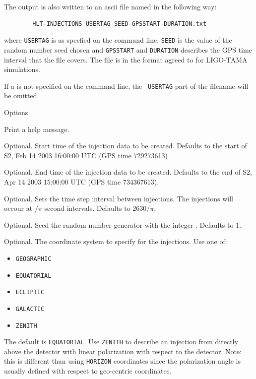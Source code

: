 \begin{entry}
The output is also written to an ascii file named in the following way:
\begin{center}
\begin{verbatim}
        HLT-INJECTIONS_USERTAG_SEED-GPSSTART-DURATION.txt
\end{verbatim}
\end{center}
where \verb$USERTAG$ is  as specfied on the command line,
\verb$SEED$ is the  value  of  the random number seed chosen and
\verb$GPSSTART$ and \verb$DURATION$ describes the GPS time interval that
the file covers. The file is in the format agreed to for LIGO-TAMA
simulations.  

If a  is not specified on the command line, the
\texttt{\_USERTAG} part of the filename will be omitted.

\item[Options]\leavevmode
\begin{entry}
\item[\option{--help}] Print a help message.

\item[\option{--gps-start-time} \parm{tstart}]
Optional.  Start time of the injection data to be created. Defaults to the
start of S2, Feb 14 2003 16:00:00 UTC (GPS time 729273613)

\item[\option{--gps-end-time} \parm{tend}]
Optional. End time of the injection data to be created. Defaults to the end
of S2, Apr 14 2003 15:00:00 UTC (GPS time 734367613).

\item[\option{--time-step} \parm{tstep}]
Optional. Sets the time step interval between injections. The injections
will occour at $/\pi$ second intervals. Defaults to $2630/\pi$.

\item[\option{--seed} \parm{seed}]
Optional. Seed the random number generator with the integer .
Defaults to $1$.

\item[\option{--coordinates} \parm{coordinates}] 
Optional.  The coordinate system to specify for the injections.  Use one
of:
\begin{itemize}
\item \texttt{GEOGRAPHIC}
\item \texttt{EQUATORIAL}
\item \texttt{ECLIPTIC}
\item \texttt{GALACTIC}
\item \texttt{ZENITH}
\end{itemize}
The default is \texttt{EQUATORIAL}.   Use \texttt{ZENITH} to describe an
injection from directly above the detector with linear polarization with
respect to the detector.  Note:  this is different than using
\texttt{HORIZON} coordinates since the polarization angle is usually
defined with respect to geo-centric coordinates.


\end{entry}
\end{entry}
